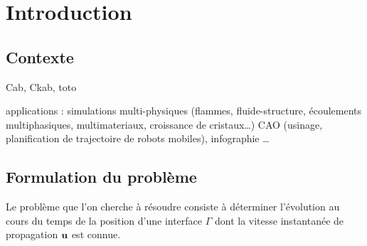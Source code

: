 \def\chapterabstract{}
\chapter{Introduction}

\section{Contexte}%

\gls{Cab}, \gls{Ckab}, \gls{toto}

applications : simulations multi-physiques (flammes, fluide-structure, écoulements multiphasiques, multimateriaux, croissance de cristaux\ldots) CAO (usinage, planification de trajectoire de robots mobiles), infographie \ldots


\section{Formulation du problème}%
Le problème que l'on cherche à résoudre consiste à déterminer l'évolution au cours du temps de la position d'une interface $\Gamma$ dont la vitesse instantanée de propagation $\mathbf{u}$ est connue.
